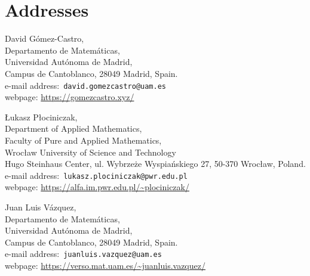 \documentclass[a4paper]{article}
\theoremstyle{definition}
\begin{document}
%
%
%
%
%
%
%
%

%

%

%

%

%

%

%

%
%
%
%
%
%
%
%
%
%
%
%
%
%
%
%
%

%
%
%
%
%
%
%
%
%
%
%
%
%
%
%
%
%
%
%
%
%
%
%
%
%
%
%
%
%
%

%

%
%
%
%
%
%
%
%
%

%
%
%
%
%
%
%
%

%
%
%
%
%
%
%
%
%
%
%
%
%
%
%

%

%
%
%
%
%
%
%
%

%

%
%
%

%

%
%

%

%

%

%

%

%

%
%
%

%
%

%
%

%

%
%
%

%
%
%
%

%
%

%
%
%
%
%
%

%

%

\section*{Addresses}

\noindent David Gómez-Castro, \\
Departamento de Matem\'{a}ticas, \\
Universidad Aut\'{o}noma de Madrid,\\ Campus de Cantoblanco, 28049 Madrid, Spain.  \\
e-mail address:~\texttt{david.gomezcastro@uam.es}\\
webpage:  \url{https://gomezcastro.xyz/}

\bigskip 

\noindent \L{}ukasz P\l{}ociniczak, \\ 
Department of Applied Mathematics, \\ 
Faculty of Pure and Applied Mathematics,\\ 
Wrocław University of Science and Technology\\
Hugo Steinhaus Center, 
ul. Wybrzeże Wyspiańskiego 27, 
50-370 Wrocław, 
Poland.  \\
e-mail address:~\texttt{lukasz.plociniczak@pwr.edu.pl}\\
webpage:  \url{https://alfa.im.pwr.edu.pl/~plociniczak/}

\bigskip

\noindent Juan Luis V\'azquez, \\ 
Departamento de Matem\'{a}ticas, \\
Universidad Aut\'{o}noma de Madrid,\\ Campus de Cantoblanco, 28049 Madrid, Spain.  \\
e-mail address:~\texttt{juanluis.vazquez@uam.es}\\
webpage:  \url{https://verso.mat.uam.es/\~juanluis.vazquez/}
\end{document}
